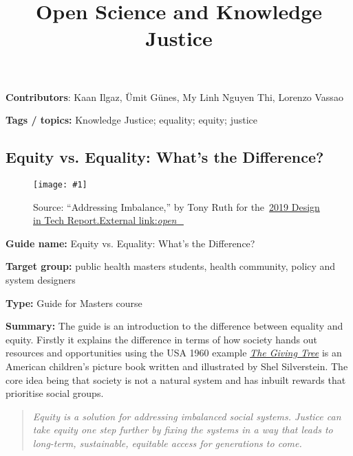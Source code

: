 \documentclass{article}
\newlength{\imgwidth}
\newcommand\scaledgraphics[2]{%
                
\settowidth{\imgwidth}{\texttt{[image: \#1]}}%
                
\setlength{\imgwidth}{\minof{\imgwidth}{#2\textwidth}}%
                
\texttt{[image: \#1]}%
                
}
\begin{document}
\title{Open Science and Knowledge Justice}

\maketitle


\textbf{Contributors}: Kaan Ilgaz, Ümit Günes, My Linh Nguyen Thi, Lorenzo Vassao


\textbf{Tags / topics:} Knowledge Justice; equality; equity; justice


\subsection{Equity vs. Equality: What’s the Difference?}\label{H7912011}



\begin{center}
\begin{figure}
\scaledgraphics{f0cce63a-bf54-49fe-bc74-0291d6668193.png}{0.75}
\caption*{Source: “Addressing Imbalance,” by Tony Ruth for the \href{https://designintech.report/2019/03/11/%F0%9F%93%B1design-in-tech-report-2019-section-6-addressing-imbalance/}{2019 Design in Tech Report.External link:}\emph{\href{https://designintech.report/2019/03/11/%F0%9F%93%B1design-in-tech-report-2019-section-6-addressing-imbalance/}{open\_}}}\label{F24704971}
\end{figure}


\end{center}


\textbf{Guide name: }Equity vs. Equality: What’s the Difference? \autocite{mphgw_the_george_washington_university_equity_2020}


\textbf{Target group: }public health masters students, health community, policy and system designers


\textbf{Type:} Guide for Masters course


\textbf{Summary: }The guide is an introduction to the difference between equality and equity. Firstly it explains the difference in terms of how society hands out resources and opportunities using the USA 1960 example \emph{\href{https://en.wikipedia.org/wiki/The_Giving_Tree}{The Giving Tree}} is an American children's picture book written and illustrated by Shel Silverstein. The core idea being that society is not a natural system and has inbuilt rewards that prioritise social groups.

\begin{quote}



\emph{Equity is a solution for addressing imbalanced social systems. Justice can take equity one step further by fixing the systems in a way that leads to long-term, sustainable, equitable access for generations to come.}


\end{quote}
\end{document}
